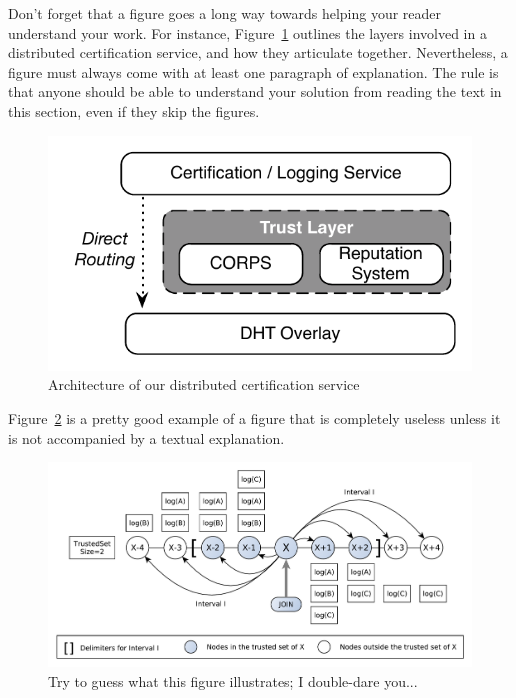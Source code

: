\documentclass{scrartcl}
\begin{document}
Don't forget that a figure goes a long way towards helping your reader understand your work. For instance, Figure~\ref{fig:ascent} outlines the layers involved in a distributed certification service, and how they articulate together. Nevertheless, a figure must always come with at least one paragraph of explanation. The rule is that anyone should be able to understand your solution from reading the text in this section, even if they skip the figures.

\begin{figure}[H]
	\begin{center}
		\includegraphics[scale=0.7]{ascent-archi.pdf}
	\end{center}
	\caption{Architecture of our distributed certification service}
	\label{fig:ascent}
\end{figure}

Figure~\ref{fig:log-archi} is a pretty good example of a figure that is completely useless unless it is not accompanied by a textual explanation.

\begin{figure}
	\begin{center}
		\includegraphics[scale=0.5]{certificates-log-archi.pdf}
	\end{center}
	\caption{Try to guess what this figure illustrates; I double-dare you...}
	\label{fig:log-archi}
\end{figure}
\end{document}
